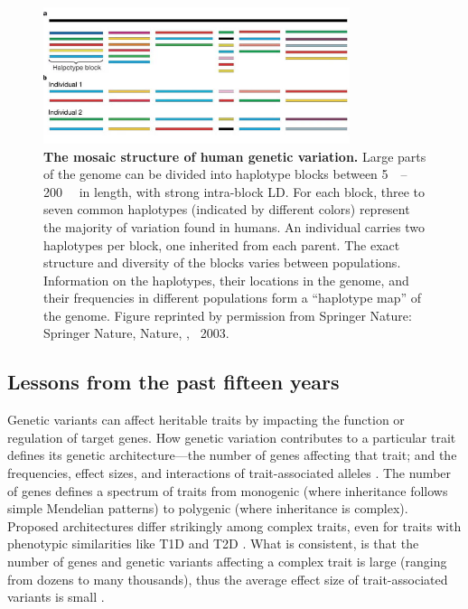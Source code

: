 \begin{outline}
\begin{figure}
    \centering
    \includegraphics[width=0.8\textwidth,page=1]{mainmatter/figures/chapter_01/paabo2003MosaicThatOur/41586_2003_Article_BFnature01400_Fig3_HTML.png}
    \caption{
        \textbf{The mosaic structure of human genetic variation.}
        Large parts of the genome can be divided into haplotype blocks between \SIrange{5}{200}{\kilo\bp} in length, with strong intra-block \gls{LD}.
        For each block, three to seven common haplotypes (indicated by different colors) represent the majority of variation found in humans.
        An individual carries two haplotypes per block, one inherited from each parent.
        The exact structure and diversity of the blocks varies between populations.
        Information on the haplotypes, their locations in the genome, and their frequencies in different populations form a \enquote{haplotype map} of the genome.
        Figure reprinted by permission from Springer Nature: Springer Nature, Nature, \textcite{paabo2003MosaicThatOur}, \textcopyright~2003.
    }
    \label{fig:intro_haplotypeBlocks}
\end{figure}

\subsection{Lessons from the past fifteen years}

Genetic variants can affect heritable traits by impacting the function or regulation of target genes.
How genetic variation contributes to a particular trait defines its genetic architecture---the number of genes affecting that trait; and the frequencies, effect sizes, and interactions of trait-associated alleles \autocite{timpson2018GeneticArchitectureShape,visscher2019Fisher1918Paper}.
The number of genes defines a spectrum of traits from monogenic (where inheritance follows simple Mendelian patterns) to polygenic (where inheritance is complex).
Proposed architectures differ strikingly among complex traits, 
even for traits with phenotypic similarities like \gls{T1D} and \gls{T2D} \autocite{timpson2018GeneticArchitectureShape}.
What is consistent, is that the number of genes and genetic variants affecting a complex trait is large (ranging from dozens to many thousands),
thus the average effect size of trait-associated variants is small \autocite{hindorff2009PotentialEtiologicFunctional,gibson2011RareCommonVariants,boyle2017ExpandedViewComplex}.


\end{outline}
